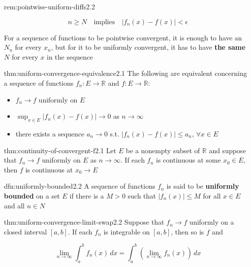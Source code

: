 \documentclass[landscape, 8pt]{extarticle}
\begin{document}
\begin{multicols}{3}
\begin{rem}{rem:pointwise-uniform-diffs}{2.2}
\begin{itemize}
			\[n\ge N\quad\text{implies}\quad \lvert f_{n}(x)-f(x) \rvert <\epsilon\]
	\end{itemize}

	For a sequence of functions to be pointwise convergent, it is enough to have an $N_{n}$ for every $x_{n}$, but for it to be uniformly convergent, it has to have \textbf{the same} $N$ for every $x$ in the sequence

\end{rem}


\begin{thm}{thm:uniform-convergence-equivalence}{2.1}
	The following are equivalent concerning a sequence of functions $f_{n}:E\to \mathbb{R}$ and $f: E\to \mathbb{R}$:

	\begin{itemize}[leftmargin=*]
		\setlength\itemsep{0em}
		\item $f_{n}\to f$ uniformly on $E$

		\item $\displaystyle\sup_{x\in E}\lvert f_{n}(x)-f(x) \rvert\to 0$ as $n\to\infty$

		\item there exists a sequence $a_{n}\to 0$ s.t. $\lvert f_{n}(x)-f(x) \rvert\le a_{n},\, \forall x\in E$

	\end{itemize}
\end{thm}


\begin{thm}[]{thm:continuity-of-convergent-f}{2.1}
	Let $E$ be a nonempty subset of $\mathbb{R}$ and suppose that $f_{n}\to f$ uniformly on $E$ as $n\to\infty$. If each $f_{n}$ is continuous at some $x_{0}\in E$, then $f$ is continuous at $x_{0}\to E$
\end{thm}

\begin{dfn}{dfn:uniformly-bounded}{2.2}
	A sequence of functions $f_{n}$ is said to be \textbf{uniformly bounded} on a set $E$ if there is a $M>0$ such that $\lvert f_{n}(x) \rvert\le M$ for all $x\in E$ and all $n\in N$

\end{dfn}

\begin{thm}[]{thm:uniform-convergence-limit-swap}{2.2}
	Suppose that $f_{n}\to f$ uniformly on a closed interval $[a,b]$. If each $f_{n}$ is integrable on $[a,b]$, then so is $f$ and 

	\[\lim_{n \to \infty} \int_{a}^{b} f_{n}(x) \, dx =\int_{a}^{b} \left(\lim_{n \to \infty} f_{n}(x)\right) \, dx \]
\end{thm}


\end{multicols}
\end{document}
